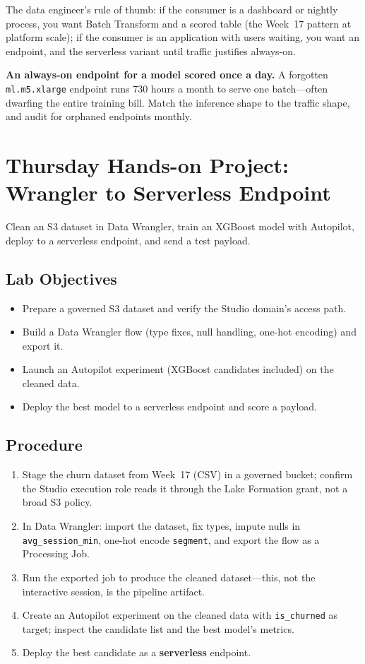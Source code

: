 The data engineer's rule of thumb: if the consumer is a dashboard or nightly process, you want Batch Transform and a scored table (the Week~17 pattern at platform scale); if the consumer is an application with users waiting, you want an endpoint, and the serverless variant until traffic justifies always-on.

\begin{pitfall}
\textbf{An always-on endpoint for a model scored once a day.} A forgotten \texttt{ml.m5.xlarge} endpoint runs 730 hours a month to serve one batch---often dwarfing the entire training bill. Match the inference shape to the traffic shape, and audit for orphaned endpoints monthly.
\end{pitfall}

\section{Thursday Hands-on Project: Wrangler to Serverless Endpoint}
Clean an S3 dataset in Data Wrangler, train an XGBoost model with Autopilot, deploy to a serverless endpoint, and send a test payload.

\subsection*{Lab Objectives}
\begin{itemize}
    \item Prepare a governed S3 dataset and verify the Studio domain's access path.
    \item Build a Data Wrangler flow (type fixes, null handling, one-hot encoding) and export it.
    \item Launch an Autopilot experiment (XGBoost candidates included) on the cleaned data.
    \item Deploy the best model to a serverless endpoint and score a payload.
\end{itemize}

\subsection*{Procedure}
\begin{enumerate}
    \item Stage the churn dataset from Week~17 (CSV) in a governed bucket; confirm the Studio execution role reads it through the Lake Formation grant, not a broad S3 policy.
    \item In Data Wrangler: import the dataset, fix types, impute nulls in \texttt{avg\_session\_min}, one-hot encode \texttt{segment}, and export the flow as a Processing Job.
    \item Run the exported job to produce the cleaned dataset---this, not the interactive session, is the pipeline artifact.
    \item Create an Autopilot experiment on the cleaned data with \texttt{is\_churned} as target; inspect the candidate list and the best model's metrics.
    \item Deploy the best candidate as a \textbf{serverless} endpoint.
\end{enumerate}

